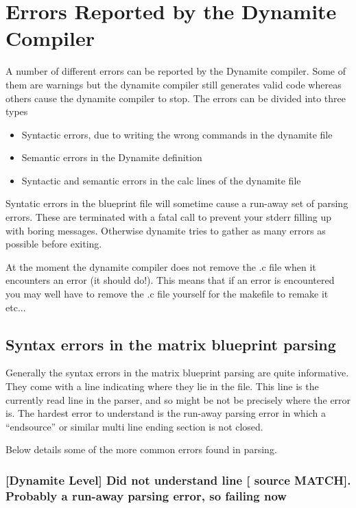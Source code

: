 \section{Errors Reported by the Dynamite Compiler}

A number of different errors can be reported by the Dynamite compiler. Some of
them are warnings but the dynamite compiler still generates valid code whereas
others cause the dynamite compiler to stop. The errors can be divided into three
types

\begin{itemize}
\item Syntactic errors, due to writing the wrong commands in the dynamite file
\item Semantic errors in the Dynamite definition
\item Syntactic and semantic errors in the calc lines of the dynamite file
\end{itemize}

Syntatic errors in the blueprint file will sometime cause a run-away set of
parsing errors. These are terminated with a fatal call to prevent your stderr
filling up with boring messages. Otherwise dynamite tries to gather as many errors
as possible before exiting.

At the moment the dynamite compiler does not remove the .c file when it encounters
an error (it should do!). This means that if an error is encountered you may well have
to remove the .c file yourself for the makefile to remake it etc...

\subsection{Syntax errors in the matrix blueprint parsing}

Generally the syntax errors in the matrix blueprint parsing are quite informative. They
come with a line indicating where they lie in the file. This line is the currently
read line in the parser, and so might be not be precisely where the error is. The hardest
error to understand is the run-away parsing error in which a ``endsource'' or similar multi
line ending section is not closed.

Below details some of the more common errors found in parsing.

\subsubsection{[Dynamite Level] Did not understand line [      source MATCH]. Probably a run-away parsing error, so failing now}

